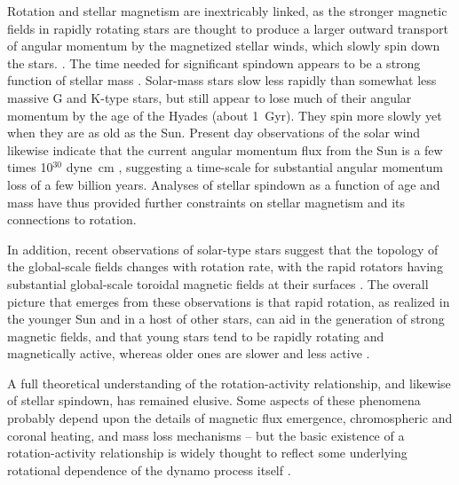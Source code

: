 Rotation and stellar magnetism are inextricably linked, as the
stronger magnetic fields in rapidly rotating stars are thought to
produce a larger outward transport of angular momentum by the
magnetized stellar winds, which slowly spin down the stars.    
\citep[e.g.,][]{Weber&Davis_1967, Skumanich_1972,
  MacGregor&Brenner_1991, Matt&Pudritz_2008}.
The time needed for significant spindown appears to be a
strong function of stellar mass \citep[e.g.,][]{Barnes_2003, West_et_al_2004}.
Solar-mass stars slow less rapidly than somewhat less massive G and K-type
stars, but still appear to lose much of their angular momentum by the
age of the Hyades (about 1~Gyr).  They spin more slowly yet when 
they are as old as the Sun.  Present day observations of the solar wind
likewise indicate that the current angular momentum flux from the Sun is a few
times 10$^{30}$ dyne~cm \citep[e.g.,][]{Pizzo_et_al_1983}, suggesting a time-scale
for substantial angular momentum loss of a few billion years.   Analyses of stellar spindown
as a function of age and mass have thus provided further constraints on
stellar magnetism and its connections to rotation.   


In addition, recent observations of solar-type stars suggest
that the topology of the global-scale fields changes with rotation rate,
with the rapid rotators having substantial global-scale toroidal
magnetic fields at their surfaces \citep{Petit_et_al_2008}.
The overall picture that emerges from these observations is that rapid
rotation, as realized in the younger Sun and in a host of other stars, can
aid in the generation of strong magnetic fields, and that
young stars tend to be rapidly rotating
and magnetically active, whereas older ones are slower and less active 
\citep[e.g.,][]{Barnes_2003, West_et_al_2004, West_et_al_2008}.  

A full theoretical understanding of the rotation-activity relationship, and
likewise of stellar spindown, has remained elusive.  Some aspects of these
phenomena probably depend upon the details of magnetic flux emergence,
chromospheric and coronal heating, and mass loss mechanisms -- but the
basic existence of a rotation-activity relationship is widely
thought to reflect some underlying rotational dependence of the dynamo
process itself \citep[e.g.,][]{Knobloch_et_al_1981, Noyes_et_al_1984a,
Baliunas_et_al_1996}.

